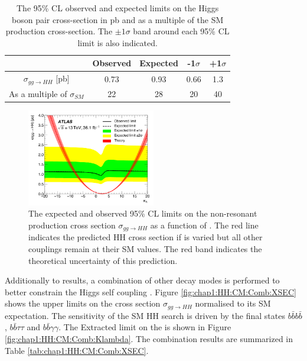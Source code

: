 \begin{table}[H]
    \centering
    \begin{tabular}{ccccc}
    \hline
         & Observed & Expected & -1$\sigma$ & +1$\sigma$ \\
    \hline
        $\sigma_{gg\rightarrow HH}$ [pb] & 0.73 & 0.93 & 0.66 & 1.3 \\
        As a multiple of $\sigma_{SM}$ & 22 & 28 & 20 & 40 \\
        \hline
    \end{tabular}
    \caption{The 95\% CL observed and expected limits on the Higgs boson pair cross-section in pb and as a multiple of the SM production cross-section. The $\pm1\sigma$ band around each 95\% CL limit is also indicated.}
    \label{tab:chap1:HH:CM:XSEC}
\end{table}
\begin{figure}[H]
    \centering
    \includegraphics[width=0.5\textwidth]{Ch1/Img/kl_36ifb.png}
    \caption{The expected and observed 95\% CL limits on the non-resonant production cross section $\sigma_{gg\rightarrow HH}$ as a function of \kl. The red line indicates the predicted HH cross section if \kl is varied but all other couplings remain at their SM values. The red band indicates the theoretical uncertainty of this prediction.}
    \label{fig:chap1:HH:CM:KL}
\end{figure}
Additionally to \HHyybb results, a combination of other decay modes is performed to better constrain the Higgs self coupling \cite{HH_Comb_36}. Figure \ref{fig:chap1:HH:CM:Comb:XSEC} shows the upper limits on the cross section $\sigma_{gg\rightarrow HH}$ normalised to its SM expectation. The sensitivity of the SM HH search is driven by the final states $b\bar{b}b\bar{b}$, $b\bar{b}\tau\tau$ and $b\bar{b}\gamma\gamma$. The Extracted limit on the \kl is shown in Figure \ref{fig:chap1:HH:CM:Comb:Klambda}. The combination results are summarized in Table \ref{tab:chap1:HH:CM:Comb:XSEC}.
